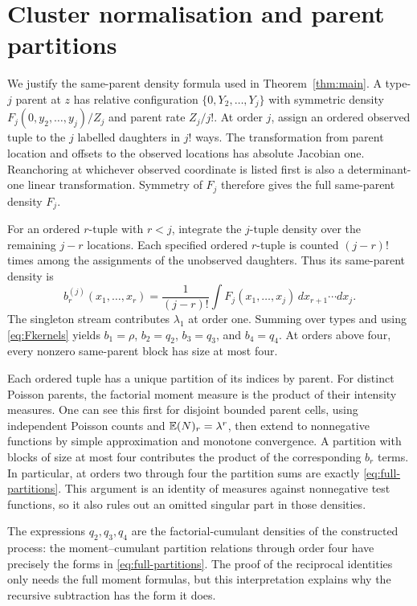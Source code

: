 \section{Cluster normalisation and parent partitions}
\label{app:partitions}

We justify the same-parent density formula used in Theorem~\ref{thm:main}. A type-$j$ parent at $z$ has relative configuration $\{0,Y_2,\ldots,Y_j\}$ with symmetric density $F_j(0,y_2,\ldots,y_j)/Z_j$ and parent rate $Z_j/j!$. At order $j$, assign an ordered observed tuple to the $j$ labelled daughters in $j!$ ways. The transformation from parent location and offsets to the observed locations has absolute Jacobian one. Reanchoring at whichever observed coordinate is listed first is also a determinant-one linear transformation. Symmetry of $F_j$ therefore gives the full same-parent density $F_j$.

For an ordered $r$-tuple with $r<j$, integrate the $j$-tuple density over the remaining $j-r$ locations. Each specified ordered $r$-tuple is counted $(j-r)!$ times among the assignments of the unobserved daughters. Thus its same-parent density is
\[
 b_r^{(j)}(x_1,\ldots,x_r)
 =\frac1{(j-r)!}\int F_j(x_1,\ldots,x_j)\,dx_{r+1}\cdots dx_j.
\]
The singleton stream contributes $\lambda_1$ at order one. Summing over types and using \eqref{eq:Fkernels} yields $b_1=\rho$, $b_2=q_2$, $b_3=q_3$, and $b_4=q_4$. At orders above four, every nonzero same-parent block has size at most four.

Each ordered tuple has a unique partition of its indices by parent. For distinct Poisson parents, the factorial moment measure is the product of their intensity measures. One can see this first for disjoint bounded parent cells, using independent Poisson counts and $\mathbb E(N)_r=\lambda^r$, then extend to nonnegative functions by simple approximation and monotone convergence. A partition with blocks of size at most four contributes the product of the corresponding $b_r$ terms. In particular, at orders two through four the partition sums are exactly \eqref{eq:full-partitions}. This argument is an identity of measures against nonnegative test functions, so it also rules out an omitted singular part in those densities.

The expressions $q_2,q_3,q_4$ are the factorial-cumulant densities of the constructed process: the moment--cumulant partition relations through order four have precisely the forms in \eqref{eq:full-partitions}. The proof of the reciprocal identities only needs the full moment formulas, but this interpretation explains why the recursive subtraction has the form it does.
